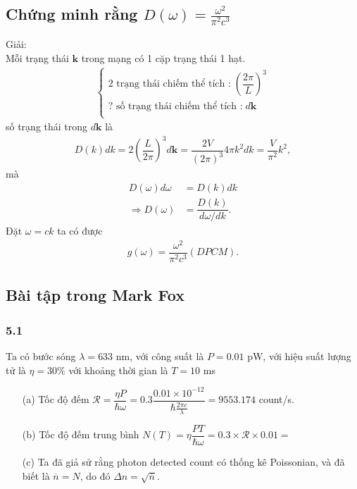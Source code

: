 \documentclass{article}
\newcommand{\f}[2]{\dfrac{#1}{#2}}
\begin{document}
\subsection*{Chứng minh rằng $D(\omega) = \frac{\omega^2}{\pi^2 c^3}$}
Giải:\\
Mỗi trạng thái $\mathbf{k}$ trong mạng có 1 cặp trạng thái 1 hạt.
\begin{align*}
	\begin{cases}
		\text{2 trạng thái chiếm thể tích :} \; \left(\f{2\pi}{L}\right)^3 \\
		\text{? số trạng thái chiếm thể tích :} \; d\mathbf{k}             \\
	\end{cases}
\end{align*}
số trạng thái trong $d\mathbf{k}$ là
\begin{align*}
	D(k)dk = 2  \left(\f{L}{2\pi}\right)^3 d\mathbf{k} = \f{2V}{(2\pi)^3} 4\pi k^2 dk = \f{V}{\pi^2}k^2,
\end{align*}
mà
\begin{align*}
	D(\omega) d\omega     & = D(k) dk                 \\
	\Rightarrow D(\omega) & = \f{D(k)}{d\omega / dk}.
\end{align*}
Đặt $\omega = ck$ ta có được
\begin{align*}
	g(\omega) = \f{\omega^2}{\pi^2 c^3} (DPCM).
\end{align*}

\subsection*{Bài tập trong Mark Fox}
\subsubsection*{5.1}
Ta có bước sóng $\lambda = 633$ nm, với công suất là $P = 0.01$ pW, với hiệu suất lượng tử là $\eta = 30\% $ với khoảng thời gian là $T = 10$ ms
\begin{enumerate}
	\item[(a)] Tốc độ đếm $\mathcal{R} = \f{\eta P}{\hbar \omega} = 0.3 \f{0.01 \times 10^{-12}}{\hbar \frac{2\pi c}{\lambda}} = 9553.174$ count/s.
	\item[(b)] Tốc độ đếm trung bình $N(T)= \eta \f{PT}{\hbar \omega} = 0.3 \times \mathcal{R}\times 0.01 =$
	\item[(c)] Ta đã giả sử rằng photon detected count có thống kê Poissonian, và đã biết là $\overline{n} = N$, do đó $\Delta n = \sqrt{\overline{n}}$.
\end{enumerate}
\end{document}
